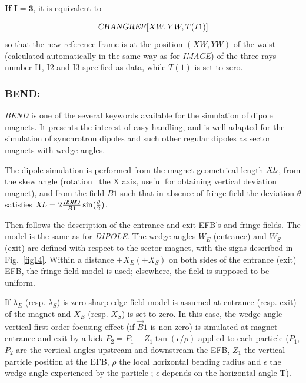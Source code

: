 \noindent\textbf{If} $\mathbf{I=3}$,  it is equivalent to 

$$\text{\textsl{CHANGREF}} \lbrack XW,YW,T(I1)\rbrack $$
%
 so that the new reference frame is at the position $ (XW, YW) $ of
the waist (calculated automatically in the same way as for 
\textsl{IMAGE}) of the three rays number I1, I2 and I3 specified as data,  while $T(1)$ is set to zero.
 
\newpage


\subsubsection*{BEND: \BENDTitl}\label{BEND}  
\medskip

\textsl{BEND}  is one of the several keywords available for the
simulation of dipole magnets. It presents the interest of easy handling, and is well adapted for 
the simulation of synchrotron dipoles and such other regular dipoles as sector magnets with wedge 
angles. 

\noindent The dipole simulation is performed from the magnet geometrical length $ X\!L $, from
 the skew angle (rotation \wrt\ the X axis, useful for obtaining vertical deviation magnet), and from the 
field $ B1 $  such that   in absence of fringe field the deviation $\theta$ satisfies 
$ X\!L = 2 \frac{B\!O\!R\!O}{B1} \sin(\frac{\theta}{2})$. 

\noindent Then follows the description of the entrance and exit EFB's and
fringe fields. The model is the same as for \textsl{DIPOLE}.   
The wedge angles $W_E $ 
(entrance) and $W_S $ (exit) are defined with respect to the sector magnet, 
with the signs described in Fig.~\ref{fig14}.  
Within a distance $ \pm X_E(\pm X_S) $ on both sides of the entrance (exit) EFB, 
the fringe field model is used; elsewhere, the field is supposed to be uniform. 

\noindent If $\lambda_{E} $ (resp. $\lambda_{S} $) is zero sharp edge field model is assumed at entrance (resp. exit) of the magnet and $X_E$ (resp. $X_S$) is set to zero.  In this case, the wedge angle vertical first order focusing effect (if $\vec  B1$ is non zero) is simulated at magnet entrance and exit by a kick $P_2 = P_1 - Z_1 \tan (\epsilon / \rho)$ applied to each particle ($P_1$, $P_2$ are the vertical angles upstream and downstream the EFB, $Z_1$ the vertical particle position at the EFB, $\rho$ the local horizontal bending radius and $\epsilon$ the wedge angle experienced by the particle ; $\epsilon$ depends on the horizontal angle T).


